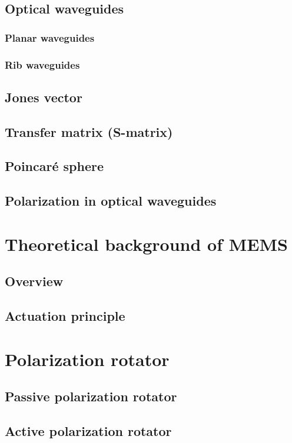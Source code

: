 \documentclass[../report.tex]{subfiles}
\begin{document}
		\subsection{Optical waveguides}
			
			\subsubsection{Planar waveguides}
			
			\subsubsection{Rib waveguides}			
		
		\subsection{Jones vector}
		
		\subsection{Transfer matrix (S-matrix)}
		
		\subsection{Poincaré sphere}
		
		\subsection{Polarization in optical waveguides}
		
	\section{Theoretical background of MEMS}
	
		\subsection{Overview}
		
		\subsection{Actuation principle}
			
	\section{Polarization rotator}
	
		\subsection{Passive polarization rotator}
	
		\subsection{Active polarization rotator}
\end{document}
